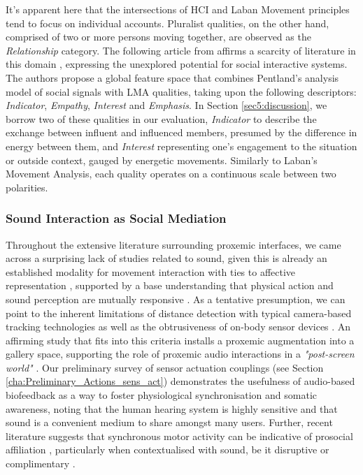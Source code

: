 It’s apparent here that the intersections of HCI and Laban Movement principles tend to focus on individual accounts. Pluralist qualities, on the other hand, comprised of two or more persons moving together, are observed as the \textit{Relationship} category. The following article from \citeauthor{roudposhti_parameterizing_2012} affirms a scarcity of literature in this domain \cite{roudposhti_parameterizing_2012}, expressing the unexplored potential for social interactive systems. The authors propose a global feature space that combines Pentland's analysis model of social signals \citep{pentland_honest_2010} with LMA qualities, taking upon the following descriptors: \textit{Indicator}, \textit{Empathy}, \textit{Interest} and \textit{Emphasis}. In Section \ref{sec5:discussion}, we borrow two of these qualities in our evaluation, \textit{Indicator} to describe the exchange between influent and influenced members, presumed by the difference in energy between them, and \textit{Interest} representing one's engagement to the situation or outside context, gauged by energetic movements. Similarly to Laban's Movement Analysis, each quality operates on a continuous scale between two polarities.

\subsubsection{Sound Interaction as Social Mediation}
\label{subsec:soundInteraction}

Throughout the extensive literature surrounding proxemic interfaces, we came across a surprising lack of studies related to sound, given this is already an established modality for movement interaction with ties to affective representation \citep{landry_interactive_2020}, supported by a base understanding that physical action and sound perception are mutually responsive \citep{krzyzaniak_six_2019}. As a tentative presumption, we can point to the inherent limitations of distance detection with typical camera-based tracking technologies \citep{wu_out_2017} as well as the obtrusiveness of on-body sensor devices \citep{hensel_defining_2006}. An affirming study that fits into this criteria \citep{rector_eyes-free_2017} installs a proxemic augmentation into a gallery space, supporting the role of proxemic audio interactions in a \textit{"post-screen world"} \citep{bryan-kinns_interaction_2017}. Our preliminary survey of sensor actuation couplings (see Section \ref{cha:Preliminary_Actions_sens_act}) demonstrates the usefulness of audio-based biofeedback as a way to foster physiological synchronisation and somatic awareness, noting that the human hearing system is highly sensitive and that sound is a convenient medium to share amongst many users. Further, recent literature suggests that synchronous motor activity can be indicative of prosocial affiliation \cite{hadley_synchrony_2021}, particularly when contextualised with sound, be it disruptive or complimentary \cite{solberg_group_2019}.

